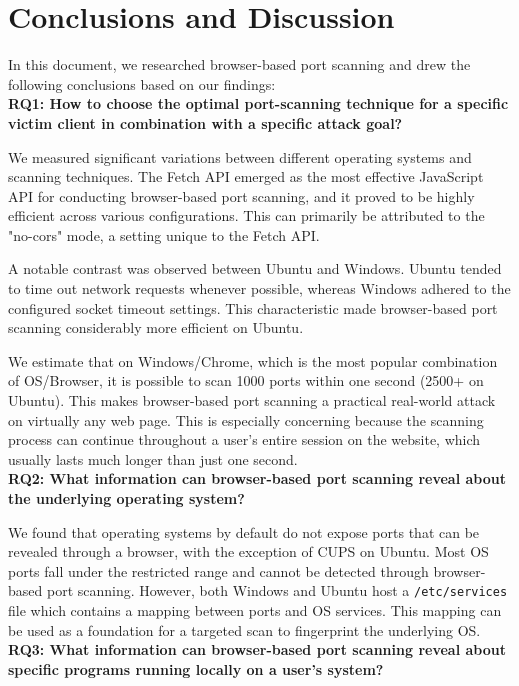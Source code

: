 \chapter{Conclusions and Discussion}

In this document, we researched browser-based port scanning and drew the following conclusions based on our findings: 
\\

\textbf{RQ1: How to choose the optimal port-scanning technique for a specific victim client in combination with a specific attack goal?}

We measured significant variations between different operating systems and scanning techniques. The Fetch API emerged as the most effective JavaScript API for conducting browser-based port scanning, and it proved to be highly efficient across various configurations. This can primarily be attributed to the "no-cors" mode, a setting unique to the Fetch API.

A notable contrast was observed between Ubuntu and Windows. Ubuntu tended to time out network requests whenever possible, whereas Windows adhered to the configured socket timeout settings. This characteristic made browser-based port scanning considerably more efficient on Ubuntu.

We estimate that on Windows/Chrome, which is the most popular combination of OS/Browser, it is possible to scan 1000 ports within one second (2500+ on Ubuntu). This makes browser-based port scanning a practical real-world attack on virtually any web page. This is especially concerning because the scanning process can continue throughout a user's entire session on the website, which usually lasts much longer than just one second. 
\\

\textbf{RQ2: What information can browser-based port scanning reveal about the underlying operating system?}

We found that operating systems by default do not expose ports that can be revealed through a browser, with the exception of CUPS on Ubuntu. Most OS ports fall under the restricted range and cannot be detected through browser-based port scanning. However, both Windows and Ubuntu host a \texttt{/etc/services} file which contains a mapping between ports and OS services. This mapping can be used as a foundation for a targeted scan to fingerprint the underlying OS.
\\

\textbf{RQ3: What information can browser-based port scanning reveal about specific programs
running locally on a user’s system?}

